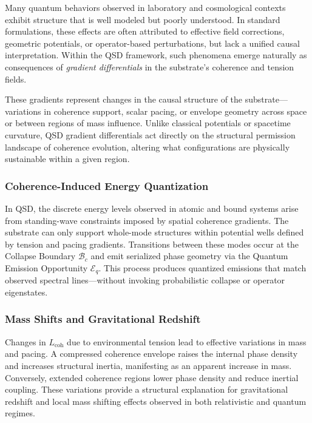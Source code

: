 \documentclass[entropy,article,submit,pdftex,moreauthors]{Definitions/mdpi}
\begin{document}
Many quantum behaviors observed in laboratory and cosmological contexts exhibit structure that is well modeled but poorly understood. In standard formulations, these effects are often attributed to effective field corrections, geometric potentials, or operator-based perturbations, but lack a unified causal interpretation. Within the QSD framework, such phenomena emerge naturally as consequences of \textit{gradient differentials} in the substrate’s coherence and tension fields.

These gradients represent changes in the causal structure of the substrate—variations in coherence support, scalar pacing, or envelope geometry across space or between regions of mass influence. Unlike classical potentials or spacetime curvature, QSD gradient differentials act directly on the structural permission landscape of coherence evolution, altering what configurations are physically sustainable within a given region.

\subsubsection{Coherence-Induced Energy Quantization}

In QSD, the discrete energy levels observed in atomic and bound systems arise from standing-wave constraints imposed by spatial coherence gradients. The substrate can only support whole-mode structures within potential wells defined by tension and pacing gradients. Transitions between these modes occur at the Collapse Boundary \( \mathcal{B}_c \) and emit serialized phase geometry via the Quantum Emission Opportunity \( \mathcal{E}_q \). This process produces quantized emissions that match observed spectral lines—without invoking probabilistic collapse or operator eigenstates.

\subsubsection{Mass Shifts and Gravitational Redshift}

Changes in \( L_{\text{coh}} \) due to environmental tension lead to effective variations in mass and pacing. A compressed coherence envelope raises the internal phase density and increases structural inertia, manifesting as an apparent increase in mass. Conversely, extended coherence regions lower phase density and reduce inertial coupling. These variations provide a structural explanation for gravitational redshift and local mass shifting effects observed in both relativistic and quantum regimes.
\end{document}
